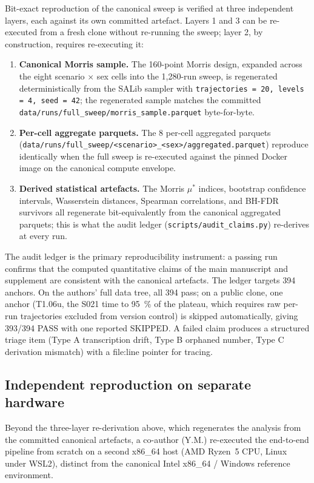 \documentclass[pdflatex,sn-nature]{sn-jnl}%
\begin{document}
Bit-exact reproduction of the canonical sweep is verified at three independent layers, each against its own committed artefact. Layers 1 and 3 can be re-executed from a fresh clone without re-running the sweep; layer 2, by construction, requires re-executing it:

\begin{enumerate}
\item \textbf{Canonical Morris sample.} The 160-point Morris design, expanded across the eight scenario $\times$ sex cells into the 1{,}280-run sweep, is regenerated deterministically from the SALib sampler with \texttt{trajectories = 20, levels = 4, seed = 42}; the regenerated sample matches the committed \texttt{data/runs/full\_sweep/morris\_sample.parquet} byte-for-byte.
\item \textbf{Per-cell aggregate parquets.} The 8 per-cell aggregated parquets (\texttt{data/runs/full\_sweep/<scenario>\_<sex>/aggregated.parquet}) reproduce identically when the full sweep is re-executed against the pinned Docker image on the canonical compute envelope.
\item \textbf{Derived statistical artefacts.} The Morris $\mu^{*}$ indices, bootstrap confidence intervals, Wasserstein distances, Spearman correlations, and BH-FDR survivors all regenerate bit-equivalently from the canonical aggregated parquets; this is what the audit ledger (\texttt{scripts/audit\_claims.py}) re-derives at every run.
\end{enumerate}

The audit ledger is the primary reproducibility instrument: a passing run confirms that the computed quantitative claims of the main manuscript and supplement are consistent with the canonical artefacts. The ledger targets 394 anchors. On the authors' full data tree, all 394 pass; on a public clone, one anchor (T1.06u, the S021 time to 95~\% of the plateau, which requires raw per-run trajectories excluded from version control) is skipped automatically, giving 393/394 PASS with one reported SKIPPED. A failed claim produces a structured triage item (Type A transcription drift, Type B orphaned number, Type C derivation mismatch) with a file:line pointer for tracing.

\subsection{Independent reproduction on separate hardware}\label{sec:s12-independent}

Beyond the three-layer re-derivation above, which regenerates the analysis from the committed canonical artefacts, a co-author (Y.M.) re-executed the end-to-end pipeline from scratch on a second x86\_64 host (AMD Ryzen~5 CPU, Linux under WSL2), distinct from the canonical Intel x86\_64 / Windows reference environment.
\end{document}
